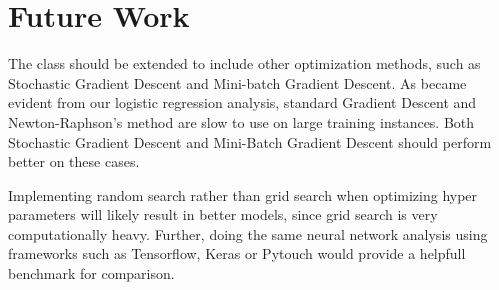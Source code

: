 \section{Future Work}\label{sec:Future}

The  class should be extended to include other optimization methods, such as Stochastic Gradient Descent and Mini-batch Gradient Descent. As became evident from our logistic regression analysis, standard Gradient Descent and Newton-Raphson's method are slow to use on large training instances. Both Stochastic Gradient Descent and Mini-Batch Gradient Descent should perform better on these cases. 

Implementing random search rather than grid search when optimizing hyper parameters will likely result in better models, since grid search is very computationally heavy. Further, doing the same neural network analysis using frameworks such as Tensorflow, Keras or Pytouch would provide a helpfull benchmark for comparison.